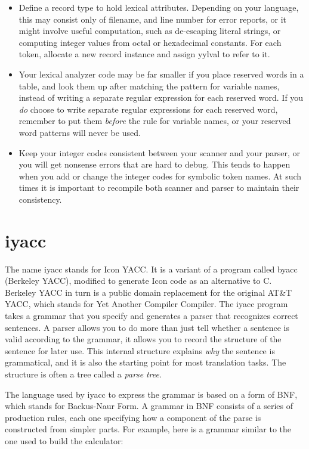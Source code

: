 \begin{itemize}
\item Define a record type to hold lexical attributes. Depending on your
language, this may consist only of filename, and line number for error
reports, or it might involve useful computation, such as de-escaping
literal strings, or computing integer values from octal or hexadecimal
constants. For each token, allocate a new record instance and assign
\textsf{yylval} to refer to it.
\item Your lexical analyzer code may be far smaller if you place reserved
words in a table, and look them up after matching the pattern for
variable names, instead of writing a separate regular expression for
each reserved word. If you \textit{do} choose to write separate regular
expressions for each reserved word, remember to put them
\textit{before} the rule for variable names, or your reserved word
patterns will never be used.
\item Keep your integer codes consistent between your scanner and your
parser, or you will get nonsense errors that are hard to debug. This
tends to happen when you add or change the integer codes for symbolic
token names. At such times it is important to recompile both scanner
and parser to maintain their consistency.
\end{itemize}

\section{iyacc}

The name \textsf{iyacc} stands for Icon YACC. It is a variant of a
program called \textsf{byacc} (Berkeley YACC), modified to
generate Icon code as an alternative to C. Berkeley YACC in turn is a
public domain replacement for the original AT\&T YACC, which stands for
Yet Another Compiler Compiler. The \textsf{iyacc} program takes a
grammar that you specify and
generates a parser that recognizes correct sentences. A parser allows
you to do more than just tell whether a sentence is valid according to
the grammar, it allows you to record the structure of the sentence for
later use. This internal structure explains \textit{why} the sentence
is grammatical, and it is also the starting point for most translation
tasks. The structure is often a tree called a \textit{parse }\textit{tree}.

The language used by \textsf{iyacc} to express the grammar is based on a
form of BNF, which stands for Backus-Naur Form. A grammar in BNF consists of a series of
production rules, each one specifying how a component of the parse is
constructed from simpler parts. For example, here is a grammar similar
to the one used to build the calculator:

